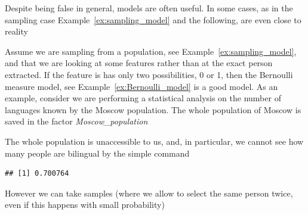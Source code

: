 	 Despite being false in general, models are often useful. In some cases, as in the sampling case Example~\ref{ex:sampling_model} and the following, are even close to reality 
	 \begin{example}[Sampling 2]
		\label{ex:sampling_features}
	Assume we are sampling from a population, see Example~\ref{ex:sampling_model}, and that we are looking at some features rather than at the exact person extracted. If the feature is has only  two possibilities, 0 or 1, then the Bernoulli measure model, see Example~\ref{ex:Bernoulli_model} is a good model. As an example, consider we are performing a statistical analysis on the number of languages known by the Moscow population.  The whole population of Moscow is saved in the factor \textit{Moscow\_population}
\begin{knitrout}
\color{fgcolor}\begin{kframe}
\begin{alltt}
 \hlkwb{<-} \hldef{(}\hldef{,}\hldef{)}
 \hlkwb{<-}    \hldef{=}  \hldef{,}    \hldef{=} \hldef{(}\hldef{,} \hldef{)  )}
 \hlkwb{<-}   
\end{alltt}
\end{kframe}
\end{knitrout}
	The whole population is unaccessible to us, and, in particular, we cannot see how many people are bilingual by the simple command
\begin{knitrout}
\color{fgcolor}\begin{kframe}
\begin{alltt}
 \hlkwb{<-}  \hlopt{==} \hldef{)}
\end{alltt}
\begin{verbatim}
## [1] 0.700764
\end{verbatim}
\end{kframe}
\end{knitrout}
	However we can take samples (where we allow to select the same person twice, even if this happens with small probability)
\begin{knitrout}

\end{knitrout}
\end{example}
